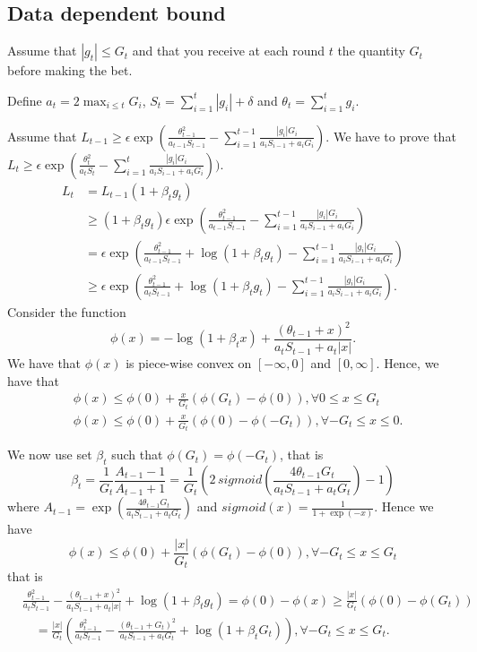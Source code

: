 \subsection{Data dependent bound}

Assume that $|g_t|\leq G_t$ and that you receive at each round $t$ the quantity $G_t$ before making the bet.

Define $a_t=2 \max_{i\leq t} G_i$, $S_t = \sum_{i=1}^t |g_i| + \delta$ and $\theta_t=\sum_{i=1}^t g_i$.

Assume that $L_{t-1}\geq \epsilon \exp(\frac{\theta_{t-1}^2}{a_{t-1} S_{t-1}}- \sum_{i=1}^{t-1} \frac{|g_i| G_i}{a_i S_{i-1} + a_i G_i})$.
We have to prove that $L_{t}\geq \epsilon \exp(\frac{\theta_{t}^2}{a_{t} S_t}- \sum_{i=1}^{t} \frac{|g_i| G_i}{a_i S_{i-1} + a_i G_i}))$.
\begin{align}
L_{t} &= L_{t-1} (1+\beta_t g_t) \\
&\geq (1+\beta_t g_t) \epsilon \exp(\frac{\theta_{t-1}^2}{a_{t-1} S_{t-1}}- \sum_{i=1}^{t-1} \frac{|g_i| G_i}{a_i S_{i-1} + a_i G_i}) \\
&=  \epsilon \exp(\frac{\theta_{t-1}^2}{a_{t-1} S_{t-1}}+\log(1+\beta_t g_t)- \sum_{i=1}^{t-1} \frac{|g_i| G_i}{a_i S_{i-1} + a_i G_i}) \\
&\geq  \epsilon \exp(\frac{\theta_{t-1}^2}{a_{t} S_{t-1}}+\log(1+\beta_t g_t)- \sum_{i=1}^{t-1} \frac{|g_i| G_i}{a_i S_{i-1} + a_i G_i}).
\end{align}
Consider the function 
\[
\phi(x)=-\log(1+\beta_t x) + \frac{(\theta_{t-1}+x)^2}{a_t S_{t-1} + a_t |x|}.
\]
We have that $\phi(x)$ is piece-wise convex on $[-\infty,0]$ and $[0,\infty]$. Hence, we have that
\begin{align}
&\phi(x) \leq \phi(0)+\frac{x}{G_t} (\phi(G_t)-\phi(0)), \forall 0 \leq x\leq G_t\\
&\phi(x) \leq \phi(0)+\frac{x}{G_t} (\phi(0)-\phi(-G_t)), \forall -G_t \leq x\leq 0.
\end{align}

We now use set $\beta_t$ such that $\phi(G_t)=\phi(-G_t)$, that is
\[
\beta_t = \frac{1}{G_t} \frac{A_{t-1}-1}{A_{t-1}+1} 
= \frac{1}{G_t} \left(2 \, sigmoid\left(\frac{4 \theta_{t-1} G_t}{a_{t} S_{t-1} + a_t G_t}\right)-1\right)
\]
where $A_{t-1}=\exp\left(\frac{4 \theta_{t-1} G_t}{a_{t} S_{t-1} + a_t G_t}\right)$ and
$sigmoid (x) =\frac{1}{1+\exp(-x)}$.
Hence we have
\[
\phi(x) \leq \phi(0)+\frac{|x|}{G_t} (\phi(G_t)-\phi(0)), \forall -G_t \leq x\leq G_t
\]
that is
\begin{align}
&\frac{\theta_{t-1}^2}{a_t S_{t-1}}-\frac{(\theta_{t-1}+x)^2}{a_t S_{t-1}+a_t |x|} + \log(1+\beta_t g_t) = \phi(0) - \phi(x) 
\geq \frac{|x|}{G_t} (\phi(0) - \phi(G_t)) \\
&\quad = \frac{|x|}{G_t} (\frac{\theta_{t-1}^2}{a_t S_{t-1}} - \frac{(\theta_{t-1}+G_t)^2}{a_t S_{t-1} + a_t G_t} + \log(1+\beta_t G_t)), \forall -G_t \leq x\leq G_t.
\end{align}


